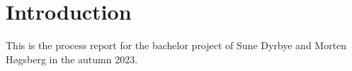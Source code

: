 \section{Introduction}
This is the process report for the bachelor project of Sune Dyrbye and Morten Høgsberg in the autumn 2023.  